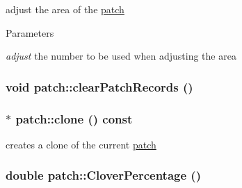 adjust the area of the \hyperlink{classpatch}{patch} 
\begin{DoxyParams}{Parameters}
\item[{\em adjust}]the number to be used when adjusting the area \end{DoxyParams}
\hypertarget{classpatch_a2b2bcc729804b8dac268f097e2a17104}{
\subsubsection[{clearPatchRecords}]{\setlength{\rightskip}{0pt plus 5cm}void patch::clearPatchRecords ()}}
\label{classpatch_a2b2bcc729804b8dac268f097e2a17104}
\hypertarget{classpatch_a132e795ca186b7b274a4b69e3e19e127}{
\subsubsection[{clone}]{ $\ast$ patch::clone () const}}
\label{classpatch_a132e795ca186b7b274a4b69e3e19e127}


creates a clone of the current \hyperlink{classpatch}{patch} \hypertarget{classpatch_af461c06a42b72cd9a26f452a0d583458}{
\subsubsection[{CloverPercentage}]{\setlength{\rightskip}{0pt plus 5cm}double patch::CloverPercentage ()}}
\label{classpatch_af461c06a42b72cd9a26f452a0d583458}


